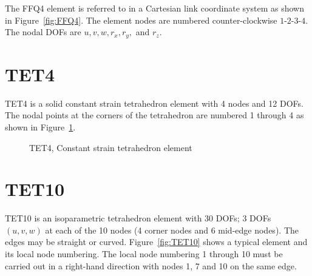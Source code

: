 The FFQ4 element is referred to in a Cartesian link coordinate system
as shown in Figure~\ref{fig:FFQ4}.
The element nodes are numbered counter-clockwise $1$-$2$-$3$-$4$.
The nodal DOFs are $u, v, w, r_x, r_y,$ and $r_z$.

\section{TET4}
\label{s:TET4}

TET4 is a solid constant strain tetrahedron element with 4 nodes and 12 DOFs.
The nodal points at the corners of the tetrahedron are numbered 1 through 4
as shown in Figure~\ref{fig:TET4}.

\begin{figure}[p]
\caption{TET4, Constant strain tetrahedron element}
\label{fig:TET4}
\end{figure}

\section{TET10}
\label{s:TET10}

TET10 is an isoparametric tetrahedron element with 30 DOFs; 3 DOFs $(u,v,w)$
at each of the 10 nodes (4 corner nodes and 6 mid-edge nodes).
The edges may be straight or curved.
Figure~\ref{fig:TET10} shows a typical element and its local node numbering.
The local node numbering 1 through 10 must be carried out in a right-hand
direction with nodes 1, 7 and 10 on the same edge.

